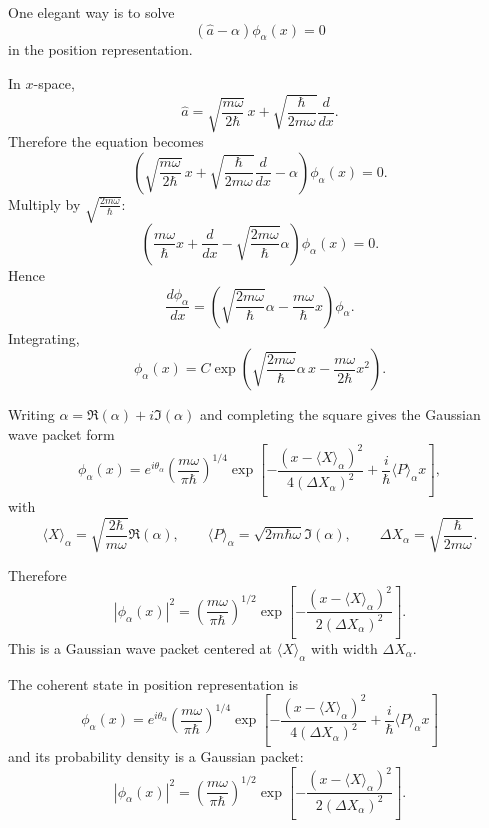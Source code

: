 \documentclass[11pt,a4paper]{scrartcl}
\begin{document}
\begin{enumerate}[label=(\alph*)]
    \begin{calculationbox}
    One elegant way is to solve
    \[
    (\hat a-\alpha)\phi_\alpha(x)=0
    \]
    in the position representation.

    In $x$-space,
    \[
    \hat a =
    \sqrt{\frac{m\omega}{2\hbar}}\,x
    +
    \sqrt{\frac{\hbar}{2m\omega}}\frac{d}{dx}.
    \]
    Therefore the equation becomes
    \[
    \left(
    \sqrt{\frac{m\omega}{2\hbar}}\,x
    +
    \sqrt{\frac{\hbar}{2m\omega}}\frac{d}{dx}
    -\alpha
    \right)\phi_\alpha(x)=0.
    \]
    Multiply by $\sqrt{\frac{2m\omega}{\hbar}}$:
    \[
    \left(
    \frac{m\omega}{\hbar}x + \frac{d}{dx}
    - \sqrt{\frac{2m\omega}{\hbar}}\alpha
    \right)\phi_\alpha(x)=0.
    \]
    Hence
    \[
    \frac{d\phi_\alpha}{dx}
    =
    \left(
    \sqrt{\frac{2m\omega}{\hbar}}\alpha
    -\frac{m\omega}{\hbar}x
    \right)\phi_\alpha.
    \]
    Integrating,
    \[
    \phi_\alpha(x)=C
    \exp\!\left(
    \sqrt{\frac{2m\omega}{\hbar}}\alpha\,x
    -\frac{m\omega}{2\hbar}x^2
    \right).
    \]

    Writing $\alpha=\Re(\alpha)+i\Im(\alpha)$ and completing the square gives the Gaussian wave packet form
    \[
    \phi_\alpha(x)
    =
    e^{i\theta_\alpha}
    \left(\frac{m\omega}{\pi\hbar}\right)^{1/4}
    \exp\!\left[
    -\frac{(x-\langle X\rangle_\alpha)^2}{4(\Delta X_\alpha)^2}
    + \frac{i}{\hbar}\langle P\rangle_\alpha x
    \right],
    \]
    with
    \[
    \langle X\rangle_\alpha=\sqrt{\frac{2\hbar}{m\omega}}\Re(\alpha),
    \qquad
    \langle P\rangle_\alpha=\sqrt{2m\hbar\omega}\Im(\alpha),
    \qquad
    \Delta X_\alpha=\sqrt{\frac{\hbar}{2m\omega}}.
    \]

    Therefore
    \[
    |\phi_\alpha(x)|^2
    =
    \left(\frac{m\omega}{\pi\hbar}\right)^{1/2}
    \exp\!\left[
    -\frac{(x-\langle X\rangle_\alpha)^2}{2(\Delta X_\alpha)^2}
    \right].
    \]
    This is a Gaussian wave packet centered at $\langle X\rangle_\alpha$ with width $\Delta X_\alpha$.
    \end{calculationbox}

    \begin{answerbox}
    The coherent state in position representation is
    \[
    \boxed{
    \phi_\alpha(x)
    =
    e^{i\theta_\alpha}
    \left(\frac{m\omega}{\pi\hbar}\right)^{1/4}
    \exp\!\left[
    -\frac{(x-\langle X\rangle_\alpha)^2}{4(\Delta X_\alpha)^2}
    + \frac{i}{\hbar}\langle P\rangle_\alpha x
    \right]
    }
    \]
    and its probability density is a Gaussian packet:
    \[
    \boxed{
    |\phi_\alpha(x)|^2
    =
    \left(\frac{m\omega}{\pi\hbar}\right)^{1/2}
    \exp\!\left[
    -\frac{(x-\langle X\rangle_\alpha)^2}{2(\Delta X_\alpha)^2}
    \right].
    }
    \]
    \end{answerbox}
\end{enumerate}
\end{document}
